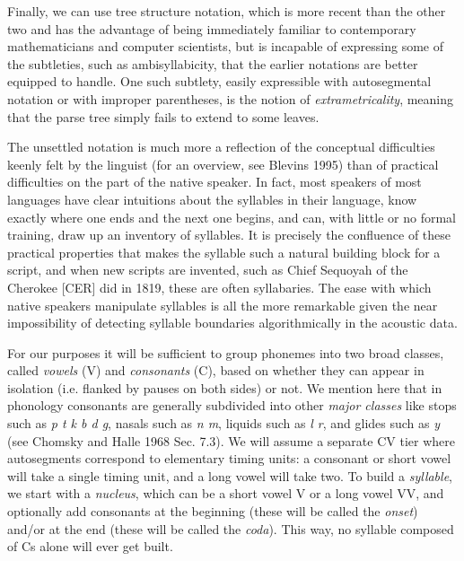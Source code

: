 Finally, we can use tree structure notation, which is more recent than the
other two and has the advantage of being immediately familiar to contemporary
mathematicians and computer scientists, but is incapable of expressing some of
the subtleties, such as ambisyllabicity, that the earlier notations are better
equipped to handle. One such subtlety, easily expressible with autosegmental
notation or with improper parentheses, is the notion of {\it
  extrametricality}, meaning that the parse tree simply fails to extend to
some leaves. 

The unsettled notation is much more a reflection of the conceptual
difficulties keenly felt by the linguist (for an overview, see Blevins 1995)
\nocite{Blevins:1995} than of practical difficulties on the part of the native
speaker. In fact, most speakers of most languages have clear intuitions about
the syllables in their language, know exactly where one ends and the next one
begins, and can, with little or no formal training, draw up an inventory of
syllables. It is precisely the confluence of these practical properties that
makes the syllable such a natural building block for a script, and when new
scripts are invented, such as Chief Sequoyah of the Cherokee [CER] did in
1819, these are often syllabaries. The ease with which native speakers
manipulate syllables is all the more remarkable given the near impossibility
of detecting syllable boundaries algorithmically in the acoustic
data. 

For our purposes it will be sufficient to group phonemes into two broad
classes, called {\it vowels} (V) and {\it consonants} (C), based on whether
they can appear in isolation (i.e. flanked by pauses on both sides) or not. We
mention here that in phonology consonants are generally subdivided into other
{\it major classes} like stops such as {\it p t k b d g}, nasals such as {\it
  n m}, liquids such as {\it l r}, and glides such as {\it y} (see Chomsky and
Halle 1968 Sec. 7.3).     We
will assume a separate CV tier where autosegments correspond to elementary
timing units: a consonant or short vowel will take a single timing unit, and a
long vowel will take two.  To build a {\it syllable}, we start
with a {\it nucleus}, which can be a short vowel V or a long vowel VV, and
optionally add consonants at the beginning (these will be called the {\it
  onset}) and/or at the end (these will be called the {\it coda\/}). This way,
no syllable composed of Cs alone will ever get built.


